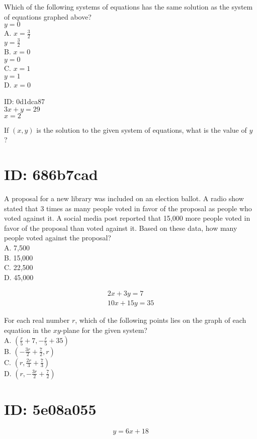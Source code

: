 Which of the following systems of equations has the same solution as the system of equations graphed above?\\
$y=0$\\
A. $x=\frac{3}{2}$\\
$y=\frac{3}{2}$\\
B. $x=0$\\
$y=0$\\
C. $x=1$\\
$y=1$\\
D. $x=0$

ID: 0d1dca87\\
$3 x+y=29$\\
$x=2$

If $(x, y)$ is the solution to the given system of equations, what is the value of $y$ ?

\section*{ID: 686b7cad}
A proposal for a new library was included on an election ballot. A radio show stated that 3 times as many people voted in favor of the proposal as people who voted against it. A social media post reported that 15,000 more people voted in favor of the proposal than voted against it. Based on these data, how many people voted against the proposal?\\
A. 7,500\\
B. 15,000\\
C. 22,500\\
D. 45,000

$$
\begin{gathered}
2 x+3 y=7 \\
10 x+15 y=35
\end{gathered}
$$

For each real number $r$, which of the following points lies on the graph of each equation in the $x y$-plane for the given system?\\
A. $\left(\frac{r}{5}+7,-\frac{r}{5}+35\right)$\\
B. $\left(-\frac{3 r}{2}+\frac{7}{2}, r\right)$\\
C. $\left(r, \frac{2 r}{3}+\frac{7}{3}\right)$\\
D. $\left(r,-\frac{3 r}{2}+\frac{7}{2}\right)$

\section*{ID: 5e08a055}
$$
y=6 x+18
$$

